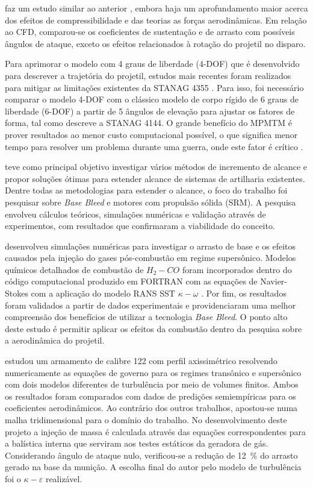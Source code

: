 \citeauthor{Sor2012Nov} faz um estudo similar ao anterior \cite{torangatti2basawaraj}, embora haja um aprofundamento maior acerca dos efeitos de compressibilidade e das teorias as forças aerodinâmicas. Em relação ao CFD, comparou-se os coeficientes de sustentação e de arrasto com possíveis ângulos de ataque, exceto os efeitos relacionados à rotação do projetil no disparo.

Para aprimorar o modelo com 4 graus de liberdade (4-DOF) que é desenvolvido para descrever a trajetória do projetil, estudos mais recentes foram realizados para mitigar as limitações existentes da STANAG 4355 \cite{Baranowski2013-1,Baranowski2013-2,Baranowski2013-3}. Para isso, foi necessário comparar o modelo 4-DOF com o clássico modelo de corpo rígido de 6 graus de liberdade (6-DOF) a partir de 5 ângulos de elevação para ajustar os fatores de forma, tal como descreve a STANAG 4144. O grande benefício do MPMTM é prover resultados ao menor custo computacional possível, o que significa menor tempo para resolver um problema durante uma guerra, onde este fator é crítico \cite{Baranowski2013-2}.

\citeauthor{Jelic2016Aug} teve como principal objetivo investigar vários métodos de incremento de alcance e propor soluções ótimas para estender alcance de sistemas de artilharia existentes. Dentre todas as metodologias para estender o alcance, o foco do trabalho foi pesquisar sobre \textit{Base Bleed} e motores com propulsão sólida (SRM). A pesquisa envolveu cálculos teóricos, simulações numéricas e validação através de experimentos, com resultados que confirmaram a viabilidade do conceito. 
	
\citeauthor{Xue2016Oct} desenvolveu simulações numéricas para investigar o arrasto de base e os efeitos causados pela injeção do gases pós-combustão em regime supersônico. Modelos químicos detalhados de combustão de \(H_{2}-CO\) foram incorporados dentro do código computacional produzido em FORTRAN com as equações de Navier-Stokes com a aplicação do modelo RANS SST \(\kappa-\omega\) \cite{Menter1994TwoequationET}. Por fim, os resultados foram validados a partir de dados experimentais e providenciaram uma melhor compreensão dos benefícios de utilizar a tecnologia \textit{Base Bleed}. O ponto alto deste estudo é permitir aplicar os efeitos da combustão dentro da pesquisa sobre a aerodinâmica do projetil. 
	
\citeauthor{belaidouni2016} estudou um armamento de calibre \qty{122}{\millimetre} com perfil axissimétrico resolvendo numericamente as equações de governo para os regimes transônico e supersônico com dois modelos diferentes de turbulência por meio de volumes finitos. Ambos os resultados foram comparados com dados de predições semiempíricas para os coeficientes aerodinâmicos. Ao contrário dos outros trabalhos, apostou-se numa malha tridimensional para o domínio do trabalho. No desenvolvimento deste projeto a injeção de massa é calculada através das equações correspondentes para a balística interna que serviram aos testes estáticos da geradora de gás. Considerando ângulo de ataque nulo, verificou-se a redução de \qty{12}{\percent} do arrasto gerado na base da munição. A escolha final do autor pelo modelo de turbulência foi o \(\kappa-\varepsilon\) realizável.
	
